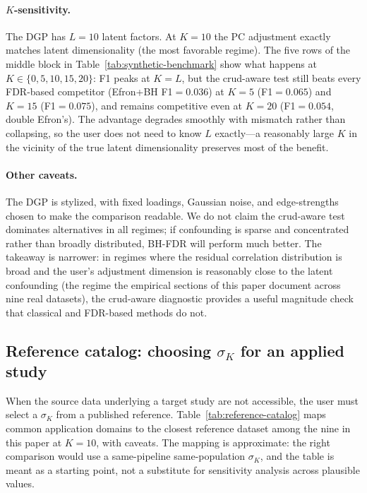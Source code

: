 \paragraph{$K$-sensitivity.} The DGP has $L=10$ latent factors. At $K=10$ the PC adjustment exactly matches latent dimensionality (the most favorable regime). The five rows of the middle block in Table~\ref{tab:synthetic-benchmark} show what happens at $K\in\{0,5,10,15,20\}$: F1 peaks at $K=L$, but the crud-aware test still beats every FDR-based competitor (Efron+BH F1$=0.036$) at $K=5$ (F1$=0.065$) and $K=15$ (F1$=0.075$), and remains competitive even at $K=20$ (F1$=0.054$, double Efron's). The advantage degrades smoothly with mismatch rather than collapsing, so the user does not need to know $L$ exactly---a reasonably large $K$ in the vicinity of the true latent dimensionality preserves most of the benefit.

\paragraph{Other caveats.} The DGP is stylized, with fixed loadings, Gaussian noise, and edge-strengths chosen to make the comparison readable. We do not claim the crud-aware test dominates alternatives in all regimes; if confounding is sparse and concentrated rather than broadly distributed, BH-FDR will perform much better. The takeaway is narrower: in regimes where the residual correlation distribution is broad and the user's adjustment dimension is reasonably close to the latent confounding (the regime the empirical sections of this paper document across nine real datasets), the crud-aware diagnostic provides a useful magnitude check that classical and FDR-based methods do not.


\subsection{Reference catalog: choosing \texorpdfstring{$\sigma_K$}{sigma\_K} for an applied study}
\label{si:reference-catalog}

When the source data underlying a target study are not accessible, the user must select a $\sigma_K$ from a published reference. Table~\ref{tab:reference-catalog} maps common application domains to the closest reference dataset among the nine in this paper at $K=10$, with caveats. The mapping is approximate: the right comparison would use a same-pipeline same-population $\sigma_K$, and the table is meant as a starting point, not a substitute for sensitivity analysis across plausible values.

